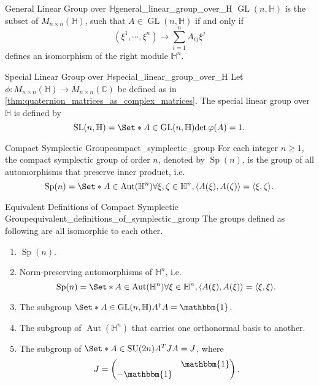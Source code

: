 \documentclass{article}
\begin{document}
\begin{definition}{General Linear Group over $\mathbb{H}$}{general_linear_group_over_H}
    $\operatorname{GL}(n,\mathbb{H})$ is the subset of $M_{n\times n}(\mathbb{H})$, such that $A\in \operatorname{GL}(n,\mathbb{H})$ if and only if
    \[ (\xi^1,\cdots,\xi^n) \rightarrow \sum_{i=1}^n A_{ij} \xi^j \]
    defines an isomorphism of the right module $\mathbb{H}^n$.
\end{definition}

\begin{definition}{Special Linear Group over $\mathbb{H}$}{special_linear_group_over_H}
    Let $\phi: M_{n\times n}(\mathbb{H}) \rightarrow M_{n\times n}(\mathbb{C})$ be defined as in \cref{thm:quaternion_matrices_as_complex_matrices}.
    The special linear group over $\mathbb{H}$ is defined by
    \[ \operatorname{SL}(n,\mathbb{H}) = \Set*{A\in\operatorname{GL}(n,\mathbb{H})}{\det \varphi(A) = 1}. \]
\end{definition}

\begin{definition}{Compact Symplectic Group}{compact_symplectic_group}
    For each integer $n\ge 1$, the compact symplectic group of order $n$, denoted by $\operatorname{Sp}(n)$, is the group of all automorphisms that preserve inner product, i.e.
    \[ \operatorname{Sp}(n) = \Set*{A\in\operatorname{Aut}(\mathbb{H}^n)}{\forall \xi,\zeta\in\mathbb{H}^n, \langle A(\xi), A(\zeta) \rangle = \langle \xi,\zeta \rangle}. \]
\end{definition}

\begin{theorem}{Equivalent Definitions of Compact Symplectic Group}{equivalent_definitions_of_symplectic_group}
    The groups defined as following are all isomorphic to each other.
    \begin{enumerate}
        \item $\operatorname{Sp}(n)$.
        \item Norm-preserving automorphisms of $\mathbb{H}^n$, i.e.
        \[ \operatorname{Sp}(n) = \Set*{A\in\operatorname{Aut}(\mathbb{H}^n)}{\forall \xi\in\mathbb{H}^n, \langle A(\xi), A(\xi) \rangle = \langle \xi,\xi \rangle}. \]
        \item The subgroup $\Set*{A\in \operatorname{GL}(n,\mathbb{H})}{A^\dagger A = \mathbbm{1}}$.
        \item The subgroup of $\operatorname{Aut}(\mathbb{H}^n)$ that carries one orthonormal basis to another.
        \item The subgroup of $\Set*{A\in \operatorname{SU}(2n)}{A^T J A = J}$, where
        \[ J = \begin{pmatrix}
            & \mathbbm{1} \\ -\mathbbm{1}
        \end{pmatrix}. \]
    \end{enumerate}
\end{theorem}
\end{document}
